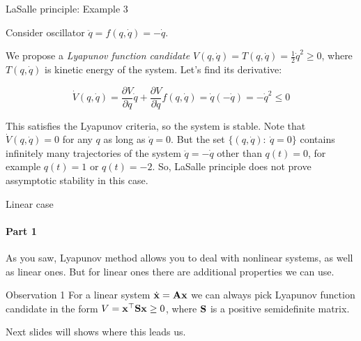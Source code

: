 \documentclass{beamer}
\begin{document}
\begin{frame}{LaSalle principle: Example 3}
	\begin{flushleft}
		
		Consider oscillator $\ddot{q} = f(q, \dot{q}) = -\dot{q}$. 
		
		\bigskip
		
		We propose a \emph{Lyapunov function candidate} $V(q, \dot{q}) = T(q, \dot{q}) = \frac{1}{2} \dot{q}^2 \geq 0$, where $T(q, \dot{q})$ is kinetic energy of the system. Let's find its derivative:
		
		\begin{equation}
			\dot V(q, \dot{q}) = 
			\frac{\partial V}{\partial q}       \dot{q} +
			\frac{\partial V}{\partial \dot{q}} f(q, \dot{q}) = 
			\dot{q} (-\dot{q}) = -\dot{q}^2 \leq 0
		\end{equation}
		
		
		This satisfies the Lyapunov criteria, so the system is stable. Note that $\dot V(q, \dot{q}) = 0$ for any $q$ as long as $\dot{q} = 0$. But the set $\{(q, \dot{q}): \   \dot{q} = 0 \}$ contains infinitely many trajectories of the system $\ddot{q} = -\dot{q}$ other than $q(t) = 0$, for example $q(t) = 1$ or $q(t) = -2$. So, LaSalle principle does not prove assymptotic stability in this case.
		
	\end{flushleft}
\end{frame}


%		
%		






\begin{frame}{Linear case}
\framesubtitle{Part 1}
\begin{flushleft}

As you saw, Lyapunov method allows you to deal with nonlinear systems, as well as linear ones. But for linear ones there are additional properties we can use.

\begin{block}{Observation 1}
For a linear system $\dot{\mathbf{x}} = \mathbf{A}\mathbf{x}$ we can always pick Lyapunov function candidate in the form $V = \mathbf{x}^\top\mathbf{S}\mathbf{x} \geq 0$, where $\mathbf{S}$ is a positive semidefinite matrix.
\end{block}

\bigskip

Next slides will shows where this leads us.

\end{flushleft}
\end{frame}
\end{document}
